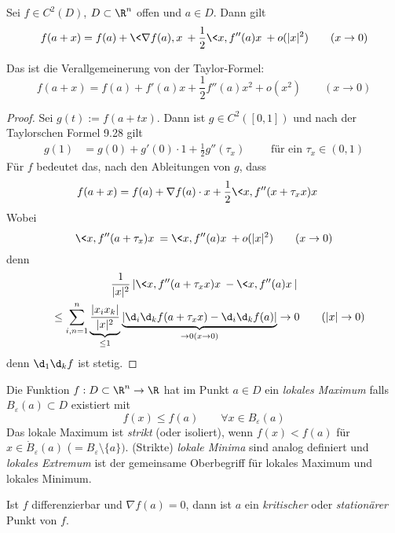 \documentclass{mycourse}
\begin{document}
\begin{thm} \label{13.11}
Sei $f\in C^2(D)$, $D\subset \R^n$ offen und $a\in D$.
Dann gilt
\[
f(a+x)=f(a)+\<\nabla f(a), x\> + \frac 12 \<x,f''(a) x\> + o(|x|^2) \qquad (x\to 0)
\]
\begin{note}
Das ist die Verallgemeinerung von der Taylor-Formel:
\[
f(a+x) = f(a) + f'(a)x + \frac 12 f''(a)x^2 + o(x^2) \qquad (x\to 0)
\]
\end{note}

\begin{proof}
Sei $g(t):= f(a+tx)$. 
Dann ist $g \in C^2([0,1])$ und nach der Taylorschen Formel 9.28 gilt
\begin{align*}
g(1) &= g(0) + g'(0)\cdot 1 + \frac 12 g''(\tau_x) \qquad \text{ für ein } \tau_x\in (0,1)
\end{align*}
Für $f$ bedeutet das, nach den Ableitungen von $g$, dass
\begin{align*}
f(a+x) &= f(a) + \nabla f(a)\cdot x + \frac 12 \<x,f''(x+\tau_x x)x\>
\end{align*}
Wobei
\[
	\<x,f''(a+\tau_x)x\> = \<x,f''(a)x\> + o(|x|^2) \qquad (x\to 0)
\]
denn
\begin{multline*}
\frac 1{|x|^2}\left|\<x,f''(a+\tau_x x)x\>-\<x,f''(a)x\>\right|\\
\quad \le \sum_{i,n=1}^n\underbrace{\frac {|x_ix_k|}{|x|^2}}_{\le 1}\underbrace{\left|\d_i\d_kf(a+\tau_x x)-\d_i\d_kf(a)\right|}_{\to 0 (x\to 0)} \to 0 \qquad (|x|\to 0)
\end{multline*}
denn $\d_1\d_kf$ ist stetig.
\end{proof}
\end{thm}

\begin{df}
Die Funktion $f:D\subset \R^n\to \R$ hat im Punkt $a\in D$ ein \emph{lokales Maximum} falls $B_\varepsilon(a)\subset D$ existiert mit
\[
f(x)\le f(a) \qquad \forall x\in B_\varepsilon(a)
\]
Das lokale Maximum ist \emph{strikt} (oder isoliert), wenn $f(x)<f(a)$ für $x\in \dot B_\varepsilon(a)$ ($=B_\varepsilon \setminus \{a\})$.
(Strikte) \emph{lokale Minima} sind analog definiert und \emph{lokales Extremum} ist der gemeinsame Oberbegriff für lokales Maximum und lokales Minimum.

Ist $f$ differenzierbar und $\nabla f(a)=0$, dann ist $a$ ein \emph{kritischer} oder \emph{stationärer} Punkt von $f$.
\end{df}
\end{document}

